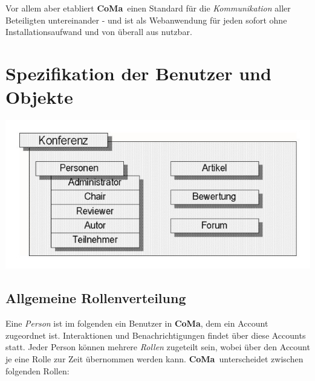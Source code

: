 \documentclass[headexclude,footexclude,12pt,BCOR0pt,DIV15]{scrartcl}
\newcommand{\CoMa}{\textbf{CoMa}}
\begin{document}
    Vor allem aber etabliert \CoMa\ einen Standard f\"{u}r die \emph{Kommunikation} aller Beteiligten
    untereinander - und ist als Webanwendung f\"{u}r jeden sofort ohne Installationsaufwand
    und von \"{u}berall aus nutzbar.

    \pagebreak

\section{Spezifikation der Benutzer und Objekte}

    \begin{center}\includegraphics[width=17cm]{uebersicht1}\end{center}

    \subsection{Allgemeine Rollenverteilung}

       Eine \emph{Person} ist im folgenden ein Benutzer in \CoMa, dem ein Account
       zugeordnet ist. Interaktionen und Benachrichtigungen findet \"{u}ber diese Accounts statt.
       Jeder Person k\"{o}nnen mehrere \emph{Rollen} zugeteilt sein, wobei \"{u}ber den Account je eine
       Rolle zur Zeit \"{u}bernommen werden kann. \CoMa\ unterscheidet zwischen folgenden Rollen:
\end{document}
